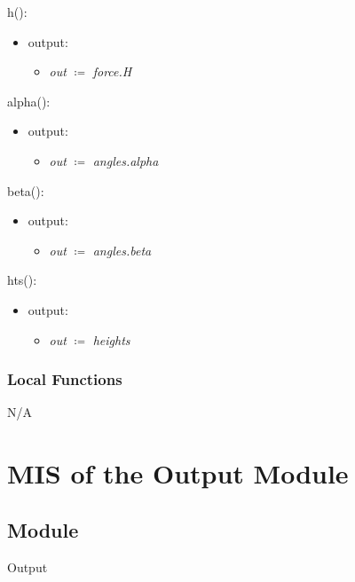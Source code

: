 \documentclass[12pt, titlepage]{article}
\begin{document}
\noindent h():
\begin{itemize}
\item output:
\begin{itemize}
	\item[] \textit{out} $\coloneqq$ \textit{force.H}\\
\end{itemize}
\end{itemize}

\noindent alpha():
\begin{itemize}
	\item output:
	\begin{itemize}
		\item[] \textit{out} $\coloneqq$ \textit{angles.alpha}\\
	\end{itemize}
\end{itemize}

\noindent beta():
\begin{itemize}
	\item output:
	\begin{itemize}
		\item[] \textit{out} $\coloneqq$ \textit{angles.beta}\\
	\end{itemize}
\end{itemize}

\noindent hts():
\begin{itemize}
	\item output:
	\begin{itemize}
		\item[] \textit{out} $\coloneqq$ \textit{heights}\\
	\end{itemize}
\end{itemize}

\subsubsection{Local Functions}
N/A

\newpage
\section{MIS of the Output Module} \label{sec:OutputMod}

\subsection{Module}
Output
\end{document}
